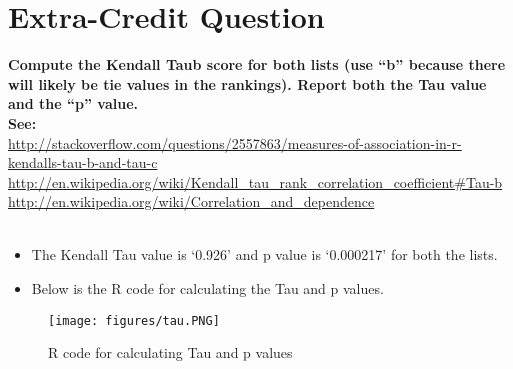 \chapter{Extra-Credit Question}
\label{intro}

\textbf {Compute the Kendall Tau\textunderscore b score for both lists (use ``b'' because there will likely be tie values in the rankings).  Report both the Tau value and the ``p'' value.\\
See:\\}
{\url{http://stackoverflow.com/questions/2557863/measures-of-association-in-r-kendalls-tau-b-and-tau-c}}\\
{\url{http://en.wikipedia.org/wiki/Kendall_tau_rank_correlation_coefficient#Tau-b}}\\
{\url{http://en.wikipedia.org/wiki/Correlation_and_dependence}}\\ \\

\begin{itemize}
\item The Kendall Tau value is `0.926' and p value is `0.000217' for both the lists.
\item Below is the R code for calculating the Tau and p values.
\end{itemize}
\begin{figure}[h!]
\begin{center}
\texttt{[image: figures/tau.PNG]}
\caption{R code for calculating Tau and p values}
\label{fig:eqfig1}
\end{center}
\end{figure}
